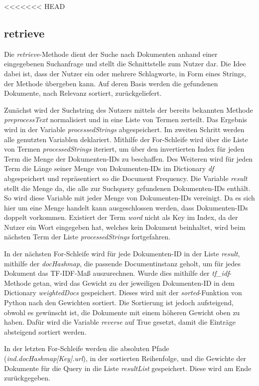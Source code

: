 <<<<<<< HEAD
\subsection{retrieve}\label{retrieve}

Die \textit{retrieve}-Methode dient der Suche nach Dokumenten anhand einer eingegebenen Suchanfrage und stellt die Schnittstelle zum Nutzer dar. Die Idee dabei ist, dass der Nutzer ein oder mehrere Schlagworte, in Form eines Strings, der Methode übergeben kann. Auf deren Basis werden die gefundenen Dokumente, nach Relevanz sortiert, zurückgeliefert. 

Zunächst wird der Suchstring des Nutzers mittels der bereits bekannten Methode \textit{preprocessText} normalisiert und in eine Liste von Termen zerteilt. Das Ergebnis wird in der Variable \textit{processedStrings} abgespeichert. Im zweiten Schritt werden alle genutzten Variablen deklariert. Mithilfe der For-Schleife wird über die Liste von Termen \textit{processedStrings} iteriert, um über den invertierten Index für jeden Term die Menge der Dokumenten-IDs zu beschaffen. Des Weiteren wird für jeden Term die Länge seiner Menge von Dokumenten-IDs im Dictionary \textit{df} abgespeichert und repräsentiert so die Document Frequency. Die Variable \textit{result} stellt die Menge da, die alle zur Suchquery gefundenen Dokumenten-IDs enthält. So wird diese Variable mit jeder Menge von Dokumenten-IDs vereinigt. Da es sich hier um eine Menge handelt kann ausgeschlossen werden, dass Dokumenten-IDs doppelt vorkommen. Existiert der Term \textit{word} nicht als Key im Index, da der Nutzer ein Wort eingegeben hat, welches kein Dokument beinhaltet, wird beim nächsten Term der Liste \emph{processedStrings} fortgefahren.

In der nächsten For-Schleife wird für jede Dokumenten-ID in der Liste \textit{result}, mithilfe der \textit{docHashmap}, die passende Documentinstanz geholt, um für jedes Dokument das TF-IDF-Maß auszurechnen. Wurde dies mithilfe der \textit{tf\_idf}-Methode getan, wird das Gewicht zu der jeweiligen Dokumenten-ID in dem Dictionary \textit{weightedDocs} gespeichert. Dieses wird mit der \textit{sorted}-Funktion von Python nach den Gewichten sortiert. Die Sortierung ist jedoch aufsteigend, obwohl es gewünscht  ist, die Dokumente mit einem höheren Gewicht oben zu haben. Dafür wird die Variable \textit{reverse} auf True gesetzt, damit die Einträge absteigend sortiert werden.

In der letzten For-Schleife werden die absoluten Pfade (\textit{ind.docHashmap[Key].url}), in der sortierten Reihenfolge, und die Gewichte der Dokumente für die Query in die Liste \textit{resultList} gespeichert. Diese wird am Ende zurückgegeben.


